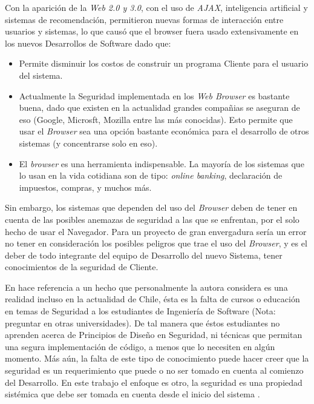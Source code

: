 Con la aparición de la \textit{Web 2.0 y 3.0}, con el uso de \textit{AJAX}, inteligencia artificial y sistemas de recomendación, permitieron nuevas formas de interacción entre usuarios y sistemas, lo que causó que el browser fuera usado extensivamente en los nuevos Desarrollos de Software dado que:
\begin{itemize}
	\item Permite disminuir los costos de construir un programa Cliente para el usuario del sistema.
	\item Actualmente la Seguridad implementada en los \textit{Web Browser} es bastante buena, dado que existen en la actualidad grandes compañias se aseguran de eso (Google, Microsft, Mozilla entre las más conocidas). Esto permite que usar el \textit{Browser} sea una opción bastante económica para el desarrollo de otros sistemas (y concentrarse solo en eso).
	\item El \textit{browser} es una herramienta indispensable. La mayoría de los sistemas que lo usan en la vida cotidiana son de tipo: \textit{online banking}, declaración de impuestos, compras, y muchos más.
\end{itemize}

Sin embargo, los sistemas que dependen del uso del \textit{Browser} deben de tener en cuenta de las posibles anemazas de seguridad a las que se enfrentan, por el solo hecho de usar el Navegador.  Para un proyecto de gran envergadura sería un error no tener en consideración los posibles peligros que trae el uso del \textit{Browser}, y es el deber de todo integrante del equipo de Desarrollo del nuevo Sistema, tener conocimientos de la seguridad de Cliente.

En \cite{goertzel2007software} hace referencia a un hecho que personalmente la autora considera es una realidad incluso en la actualidad de Chile, ésta es la falta de cursos o educación en temas de Seguridad a los estudiantes de Ingeniería de Software (Nota: preguntar en otras universidades). De tal manera que éstos estudiantes no aprenden acerca de Principios de Diseño en Seguridad, ni técnicas que permitan una segura implementación de código, a menos que lo necesiten en algún momento. Más aún, la falta de este tipo de conocimiento puede hacer creer que la seguridad es un requerimiento que puede o no ser tomado en cuenta al comienzo del Desarrollo. En este trabajo el enfoque es otro, la seguridad es una propiedad sistémica que debe ser tomada en cuenta desde el inicio del sistema \cite{braz2008eliciting, fernandez2013security}.

